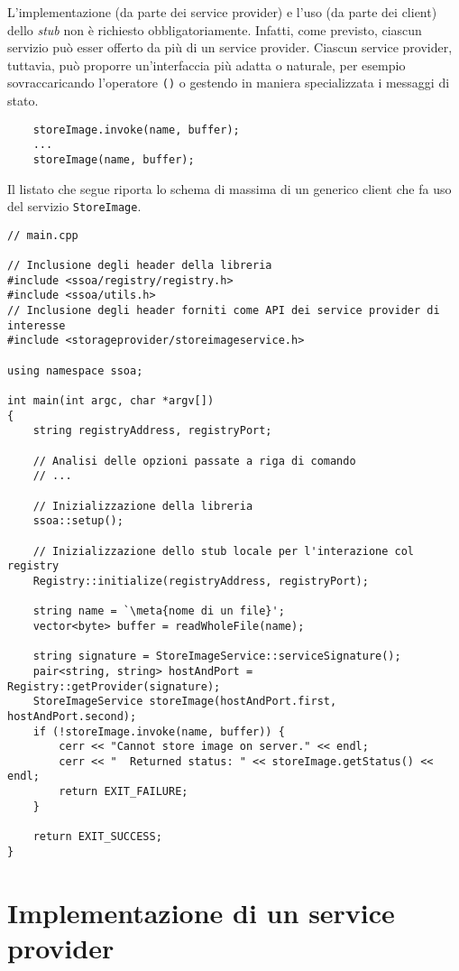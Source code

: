 \documentclass[a4paper,twoside]{article}
\newcommand*\meta[1]{$\langle$\emph{#1}$\rangle$}
\newcommand\code{\lstinline[basicstyle=\normalsize\ttfamily]}
\begin{document}
L'implementazione (da parte dei service provider) e l'uso (da parte dei client) dello \emph{stub} non è richiesto obbligatoriamente. Infatti, come previsto, ciascun servizio può esser offerto da più di un service provider. Ciascun service provider, tuttavia, può proporre un'interfaccia più adatta o naturale, per esempio sovraccaricando l'operatore \code|()| o gestendo in maniera specializzata i messaggi di stato.
\begin{lstlisting}
    storeImage.invoke(name, buffer);
    ...
    storeImage(name, buffer);
\end{lstlisting}

Il listato che segue riporta lo schema di massima di un generico client che fa uso del servizio \code|StoreImage|.

\begin{lstlisting}
// main.cpp

// Inclusione degli header della libreria
#include <ssoa/registry/registry.h>
#include <ssoa/utils.h>
// Inclusione degli header forniti come API dei service provider di interesse
#include <storageprovider/storeimageservice.h>

using namespace ssoa;

int main(int argc, char *argv[])
{
    string registryAddress, registryPort;

    // Analisi delle opzioni passate a riga di comando
    // ...

    // Inizializzazione della libreria
    ssoa::setup();

    // Inizializzazione dello stub locale per l'interazione col registry
    Registry::initialize(registryAddress, registryPort);

    string name = `\meta{nome di un file}';
    vector<byte> buffer = readWholeFile(name);

    string signature = StoreImageService::serviceSignature();
    pair<string, string> hostAndPort = Registry::getProvider(signature);
    StoreImageService storeImage(hostAndPort.first, hostAndPort.second);
    if (!storeImage.invoke(name, buffer)) {
        cerr << "Cannot store image on server." << endl;
        cerr << "  Returned status: " << storeImage.getStatus() << endl;
        return EXIT_FAILURE;
    }

    return EXIT_SUCCESS;
}
\end{lstlisting}


\section{Implementazione di un service provider}
\end{document}

